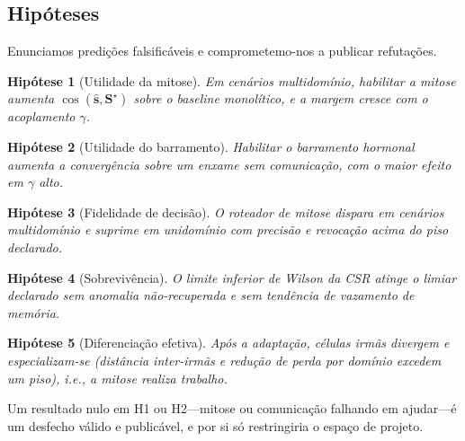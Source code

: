 \documentclass[11pt]{article}
\newtheorem{hipotese}{Hipótese}
\begin{document}
\subsection{Hipóteses}
Enunciamos predições falsificáveis e comprometemo-nos a publicar refutações.
\begin{hipotese}[Utilidade da mitose]
Em cenários multidomínio, habilitar a mitose aumenta
$\cos(\hat{\mathbf{s}},\mathbf{S}^\star)$ sobre o \emph{baseline} monolítico, e a
margem \emph{cresce} com o acoplamento $\gamma$.
\end{hipotese}
\begin{hipotese}[Utilidade do barramento]
Habilitar o barramento hormonal aumenta a convergência sobre um enxame sem
comunicação, com o maior efeito em $\gamma$ alto.
\end{hipotese}
\begin{hipotese}[Fidelidade de decisão]
O roteador de mitose dispara em cenários multidomínio e suprime em unidomínio com
precisão e revocação acima do piso declarado.
\end{hipotese}
\begin{hipotese}[Sobrevivência]
O limite inferior de Wilson da CSR atinge o limiar declarado sem anomalia
não-recuperada e sem tendência de vazamento de memória.
\end{hipotese}
\begin{hipotese}[Diferenciação efetiva]
Após a adaptação, células irmãs divergem e especializam-se (distância inter-irmãs
e redução de perda por domínio excedem um piso), i.e., a mitose realiza trabalho.
\end{hipotese}
Um resultado nulo em H1 ou H2---mitose ou comunicação falhando em ajudar---é um
desfecho válido e publicável, e por si só restringiria o espaço de projeto.

\end{document}
